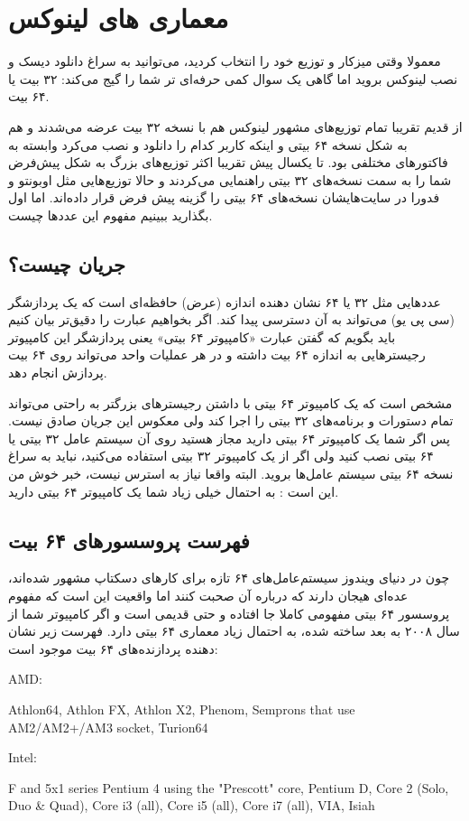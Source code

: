 \section{معماری های لینوکس}
معمولا وقتی میزکار و توزیع خود را انتخاب کردید، می‌توانید به سراغ دانلود دیسک و نصب لینوکس بروید اما گاهی یک سوال کمی حرفه‌ای تر شما را گیج می‌کند: ۳۲ بیت یا ۶۴ بیت.

از قدیم تقریبا تمام توزیع‌های مشهور لینوکس هم با نسخه ۳۲ بیت عرضه می‌شدند و هم به شکل نسخه ۶۴ بیتی و اینکه کاربر کدام را دانلود و نصب می‌کرد وابسته به فاکتورهای مختلفی بود. تا یکسال پیش تقریبا اکثر توزیع‌های بزرگ به شکل پیش‌فرض شما را به سمت نسخه‌های ۳۲ بیتی راهنمایی می‌کردند و حالا توزیع‌هایی مثل اوبونتو و فدورا در سایت‌هایشان نسخه‌های ۶۴ بیتی را گزینه پیش فرض قرار داده‌اند. اما اول بگذارید ببینیم مفهوم این عددها چیست.

\subsection*{جریان چیست؟}

عددهایی مثل ۳۲ یا ۶۴ نشان دهنده اندازه (عرض) حافظه‌ای است که یک پردازشگر (سی پی یو) می‌تواند به آن دسترسی پیدا کند. اگر بخواهیم عبارت را دقیق‌تر بیان کنیم باید بگویم که گفتن عبارت «کامپیوتر ۶۴ بیتی» یعنی پردازشگر این کامپیوتر رجیسترهایی به اندازه ۶۴ بیت داشته و در هر عملیات واحد می‌تواند روی ۶۴ بیت پردازش انجام دهد.

مشخص است که یک کامپیوتر ۶۴ بیتی با داشتن رجیسترهای بزرگتر به راحتی می‌تواند تمام دستورات و برنامه‌های ۳۲ بیتی را اجرا کند ولی معکوس این جریان صادق نیست. پس اگر شما یک کامپیوتر ۶۴ بیتی دارید مجاز هستید روی آن سیستم عامل ۳۲ بیتی یا ۶۴ بیتی نصب کنید ولی اگر از یک کامپیوتر ۳۲ بیتی استفاده می‌کنید، نباید به سراغ نسخه ۶۴ بیتی سیستم عامل‌ها بروید. البته واقعا نیاز به استرس نیست، خبر خوش من این است : به احتمال خیلی زیاد شما یک کامپیوتر ۶۴ بیتی دارید.

\subsection*{فهرست پروسسور‌های ۶۴ بیت}
چون در دنیای ویندوز سیستم‌عامل‌های ۶۴ تازه برای کارهای دسکتاپ مشهور شده‌اند، عده‌ای هیجان دارند که درباره آن صحبت کنند اما واقعیت این است که مفهوم پروسسور ۶۴ بیتی مفهومی کاملا جا افتاده و حتی قدیمی است و اگر کامپیوتر شما از سال ۲۰۰۸ به بعد ساخته شده، به احتمال زیاد معماری ۶۴ بیتی دارد. فهرست زیر نشان دهنده پردازنده‌های ۶۴ بیت موجود است:
\begin{frameng}
AMD:

Athlon64, Athlon FX, Athlon X2, Phenom, Semprons that use AM2/AM2+/AM3 socket, Turion64

Intel:

F and 5x1 series Pentium 4 using the "Prescott" core, Pentium D, Core 2 (Solo, Duo \& Quad), Core i3 (all), Core i5 (all), Core i7 (all), VIA, Isiah
\end{frameng}

